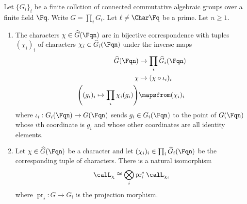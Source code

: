 \begin{lemma} \label{lemma:characters_on_product_of_connected_commutative_algebraic_groups_over_a_finite_field_correspond_to_tuples_of_characters_of_the_individual_groups}
    Let $\{G_i\}_{i}$ be a finite collction of connected commutative algebraic groups over a finite field $\Fq$. Write $G = \prod_i G_i$. Let $\ell \neq \Char \Fq$ be a prime. Let $n \geq 1$. 
    \begin{enumerate}
        \item The characters $\chi \in \widehat{G}(\Fqn)$ are in bijective correspondence with tuples $(\chi_i)_{i}$ of characters $\chi_i \in \widehat{G}_i(\Fqn)$ under the inverse maps
        \begin{align*}
            \widehat{G}(\Fqn) &\to \prod_i \widehat{G}_i(\Fqn) \\
             \chi & \mapsto (\chi \circ \iota_i)_i \\
             \left( (g_i)_i \mapsto \prod_i \chi_i(g_i) \right) & \mapsfrom (\chi_i)_i
        \end{align*}
        where $\iota_i: G_i(\Fqn) \to G(\Fqn)$ sends $g_i \in G_i(\Fqn)$ to the point of $G(\Fqn)$ whose $i$th coordinate is $g_i$ and whose other coordinates are all identity elements.

        \item Let $\chi \in \widehat{G}(\Fqn)$ be a character and let $(\chi_i)_i \in \prod_i \widehat{G}_i(\Fqn)$ be the corresponding tuple of characters. There is a natural isomorphism
        $$\calL_{\chi} \cong \bigotimes_i \operatorname{pr}_i^* \calL_{\chi_i}$$
        where $\operatorname{pr}_i: G \to G_i$ is the projection morphism.
    \end{enumerate}
\end{lemma}
